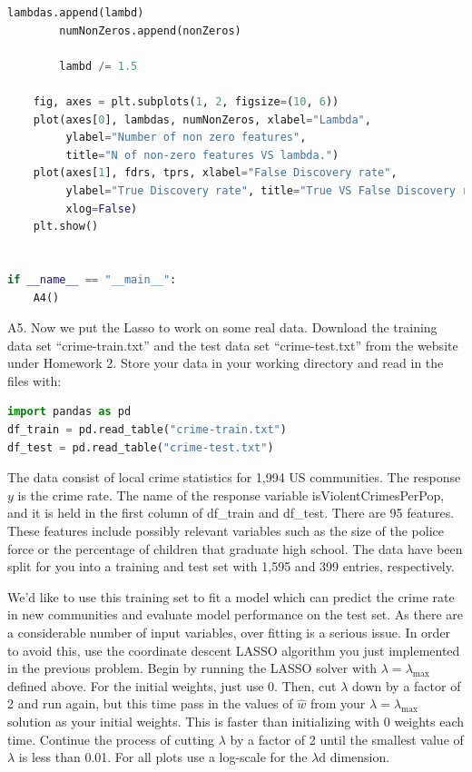 \documentclass{article}
\newcommand{\1}{\mathbf{1}}
\begin{document}
\begin{enumerate}
\begin{lstlisting}[language=Python]
        lambdas.append(lambd)
        numNonZeros.append(nonZeros)

        lambd /= 1.5

    fig, axes = plt.subplots(1, 2, figsize=(10, 6))
    plot(axes[0], lambdas, numNonZeros, xlabel="Lambda",
         ylabel="Number of non zero features",
         title="N of non-zero features VS lambda.")
    plot(axes[1], fdrs, tprs, xlabel="False Discovery rate",
         ylabel="True Discovery rate", title="True VS False Discovery rates.",
         xlog=False)
    plt.show()


if __name__ == "__main__":
    A4()
\end{lstlisting}
\end{enumerate}




\newpage
A5. Now we put the Lasso to work on some real data.  Download the training data set “crime-train.txt” and the test data set “crime-test.txt” from the website under Homework 2.  Store your data in your working directory and read in the files with:
\begin{lstlisting}[language=Python]
import pandas as pd
df_train = pd.read_table("crime-train.txt")
df_test = pd.read_table("crime-test.txt")
\end{lstlisting}

The data consist of local crime statistics for 1,994 US communities. The response $y$ is the crime rate. The name of the response variable isViolentCrimesPerPop, and it is held in the first column of df\_train and df\_test. There are 95 features. These features include possibly relevant variables such as the size of the police force or the percentage of children that graduate high school. The data have been split for you into a training and test set with 1,595 and 399 entries, respectively.

We’d like to use this training set to fit a model which can predict the crime rate in new communities and evaluate model performance on the test set. As there are a considerable number of input variables, over fitting is a serious issue. In order to avoid this, use the coordinate descent LASSO algorithm you just implemented in the previous problem. Begin by running the LASSO solver with $\lambda = \lambda_{\max}$ defined above. For the initial weights, just use 0. Then, cut $\lambda$ down by a factor of 2 and run again, but this time pass in the values of $\widehat w$ from your $\lambda = \lambda_{\max}$ solution as your initial weights. This is faster than initializing with 0 weights each time. Continue the process of cutting $\lambda$ by a factor of 2 until the smallest value of $\lambda$ is less than 0.01. For all plots use a log-scale for the $\lambda$d dimension.
\end{document}
